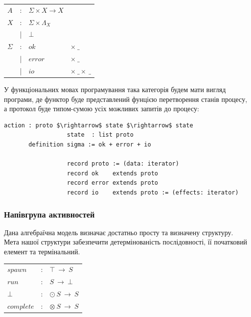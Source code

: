 \documentclass[11pt,oneside]{article}
\begin{document}
\begin{center}
\begin{tabular}{lcll}
$A$         &:& $\Sigma \times X \rightarrow X  $ &\\
$X$         &:& $\Sigma \times \Lambda_{X} $ &\\
            &|& $\bot                              $ &\\
$\Sigma$    &:& $ok$    & $\times\ \_$          \\
            &|& $error$ & $\times\ \_$          \\
            &|& $io$    & $\times\ \_ \times\ \_$          \\
\end{tabular}
\end{center}

   У функціональних мовах програмування така категорія будем мати вигляд програми,
   де функтор буде представлений фунцією перетворення станів процесу, а протокол
   буде типом-сумою усіх можливих запитів до процесу:

\begin{center}
\begin{lstlisting}[mathescape=true]
                  action : proto $\rightarrow$ state $\rightarrow$ state
                  state  : list proto
       definition sigma := ok + error + io

                  record proto := (data: iterator)
                  record ok    extends proto
                  record error extends proto
                  record io    extends proto := (effects: iterator)
\end{lstlisting}
\end{center}

  \subsubsection*{Напівгрупа активностей}

  Дана алгебраїчна модель визначає достатньо просту та визначену структуру.
  Мета нашої структури забезпечити детермінованість послідовності,
  її початковий елемент та термінальний. 

\begin{center}
\begin{tabular}{lcl}
$spawn$       &:& $\top\ \rightarrow\ S$\\
$run$         &:& $S\ \rightarrow\ \bot$\\
$\bot$        &:& $\odot\ S\ \rightarrow\ S$\\
$complete$    &:& $\otimes\ S\ \rightarrow\ S$\\
\end{tabular}
\end{center}
\end{document}
